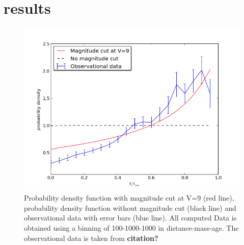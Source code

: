 \documentclass[a4paper,10pt]{article}
\begin{document}
 \newpage
 \section{results}
 \begin{figure}[h!]
   \includegraphics[width=\textwidth]{plot1}
   \caption{Probability density function with magnitude cut at V=9 (red line), probability density function without magnitude cut
   (black line) and observational data with error bars (blue line). All computed Data is obtained using a binning of 100-1000-1000
   in distance-mass-age. The observational data is taken from \textbf{citation?}\label{all3}}
 \end{figure}
 
\end{document}
